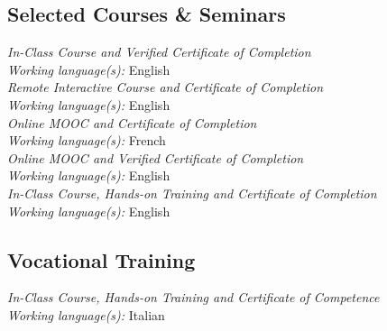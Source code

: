 \documentclass[
  a4paper, 
]{fortysecondscv}
\begin{document}
\subsection{Selected Courses \& Seminars}
\begin{cvtable}
		{{\small\emph{\small In-Class Course and Verified Certificate of Completion}\\\textit{\small Working language(s):} English}\\[-0.8em]}
		{{\small\emph{\small Remote Interactive Course and Certificate of Completion}\\\textit{\small Working language(s):} English}\\[-0.8em]}
		{{\small\emph{\small Online MOOC and Certificate of Completion}\\\textit{\small Working language(s):} French}\\[-0.8em]}
		{{\small\emph{\small Online MOOC and Verified Certificate of Completion}\\\textit{\small Working language(s):} English}\\[-0.8em]}
		{{\small\emph{\small In-Class Course, Hands-on Training and Certificate of Completion}\\\textit{\small Working language(s):} English}}
\end{cvtable}
\subsection{Vocational Training}
\begin{cvtable}
		{{\small\emph{\small In-Class Course, Hands-on Training and Certificate of Competence}\\\textit{\small Working language(s):} Italian}}
\end{cvtable}
\end{document}
